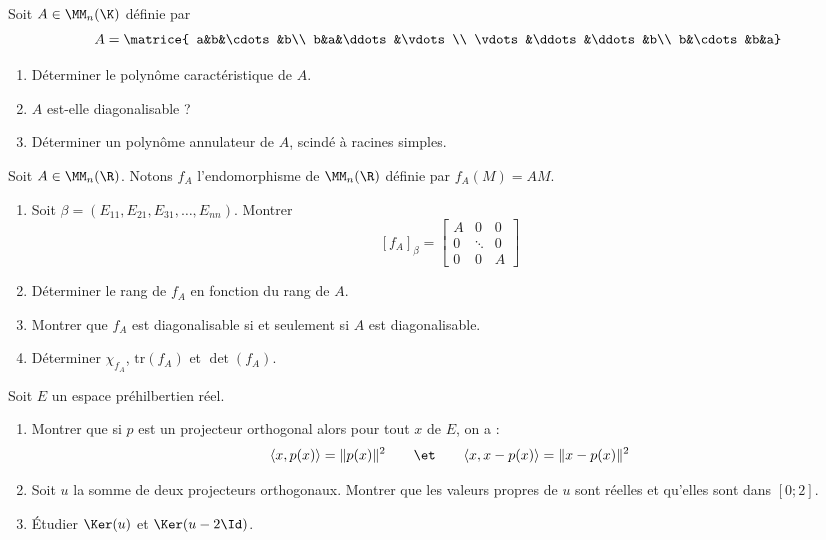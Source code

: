 \documentclass[french,11pt,twoside]{VcCours}
\begin{document}
\begin{Exercice}
  Soit $A\in\MM_n(\K)$ définie par
  \[A=\matrice{
    a&b&\cdots&b\\
    b&a&\ddots&\vdots\\
    \vdots&\ddots&\ddots&b\\
    b&\cdots&b&a}
  \]
\begin{enumerate}
  \item Déterminer le polynôme caractéristique de $A$.
  \item $A$ est-elle diagonalisable ?
  \item Déterminer un polynôme annulateur de $A$, 
  scindé à racines simples.
\end{enumerate}
\end{Exercice}


\begin{Exercice}
  Soit $A\in\MM_n(\R)$. Notons $f_A$ l’endomorphisme 
  de $\MM_n(\R)$ définie par $f_A(M)=AM$.
  \begin{enumerate}
    \item Soit $\beta=(E_{11},E_{21},E_{31},\ldots,E_{nn})$.
    Montrer
    \[[f_A]_{\beta}=\left[
    \begin{array}{c|c|c}
      A&0&0\\\hline0&\ddots&0\\\hline0&0&A      
    \end{array}\right]\]
    \item Déterminer le rang de $f_A$ en fonction du rang de $A$.
    \item Montrer que $f_A$ est diagonalisable si et seulement si $A$ est diagonalisable.
    \item Déterminer $\chi_{f_A}$, $\text{tr}(f_A)$ et $\det(f_A)$.
  \end{enumerate}
\end{Exercice}


\begin{Exercice}
  Soit $E$ un espace préhilbertien réel.
  \begin{enumerate}
    \item Montrer que si $p$ est un projecteur orthogonal alors pour tout $x$ de $E$, on a :
      \[\langle x, p(x)\rangle = \Vert p(x)\Vert^2\qquad\et\qquad \langle x,x-p(x)\rangle = \Vert x-p(x)\Vert^2\]
    \item Soit $u$ la somme de deux projecteurs orthogonaux. Montrer que les valeurs propres de $u$ sont réelles et qu’elles
      sont dans $[0;2]$.
\item Étudier $\Ker(u)$ et $\Ker(u-2\Id)$.
  \end{enumerate}
\end{Exercice}
\end{document}
